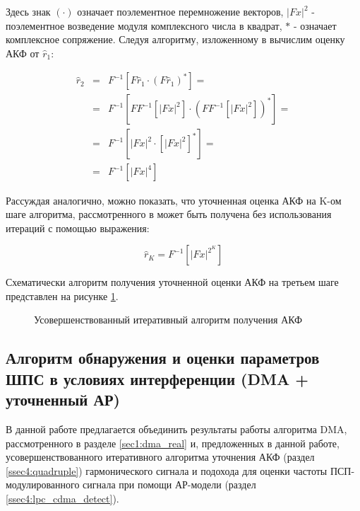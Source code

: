 Здесь знак ${(\cdot)}$  означает поэлементное перемножение векторов, ${\left| Fx \right| ^2}$ - поэлементное возведение модуля комплексного числа в квадрат, ${*}$ - означает
комплексное сопряжение.  Следуя алгоритму, изложенному в \cite{ostanin_akf} вычислим оценку АКФ от ${\hat{r}_1}$:

\begin{center}
\begin{eqnarray}
	\label{eq:akf_2}
	\hat{r}_2 & = & F^{-1}\left[ F \hat{r}_1 \cdot (F \hat{r}_1)^* \right] = \nonumber \\
		& = & F^{-1}	\left[ 
				FF^{-1} \left[
						\left| Fx \right| ^2
					\right]
						\cdot \left( FF^{-1} \left[ \left| Fx \right| ^2 \right]
					\right) ^*
			\right] = \nonumber \\
		& = & F^{-1} \left[ \left| Fx \right| ^2 \cdot \left[ \left| Fx \right| ^2 \right] ^* \right] =  \nonumber \\
		& = & F^{-1} \left[ \left| Fx \right| ^4 \right]
\end{eqnarray}
\end{center}

Рассуждая аналогично, можно показать, что уточненная оценка АКФ на K-ом шаге алгоритма, рассмотренного в \cite{ostanin_akf}
может быть получена без использования итераций с помощью выражения:

\begin{center}
\begin{equation}
	\label{eq:akf_3}
	\hat{r}_K = F^{-1}\left[ \left| Fx \right| ^{2^K} \right]
\end{equation}
\end{center}

Схематически алгоритм получения уточненной оценки АКФ на третьем шаге представлен на рисунке \ref{pic:akf_pic}.

\begin{figure}[H]
	\center{}
	\caption{Усовершенствованный итеративный алгоритм получения АКФ}
	\label{pic:akf_pic}
\end{figure}

\subsection{Алгоритм обнаружения и оценки параметров ШПС в условиях интерференции (DMA + уточненный АР)}
\label{sec4:dma_lpc_algo}

В данной работе предлагается объединить результаты работы алгоритма DMA, рассмотренного в разделе
\ref{sec1:dma_real} и, предложенных в данной работе, усовершенствованного итеративного 
алгоритма уточнения АКФ (раздел \ref{ssec4:quadruple}) гармонического сигнала и 
подохода для оценки частоты ПСП-модулированного сигнала при помощи АР-модели (раздел \ref{ssec4:lpc_cdma_detect}).

